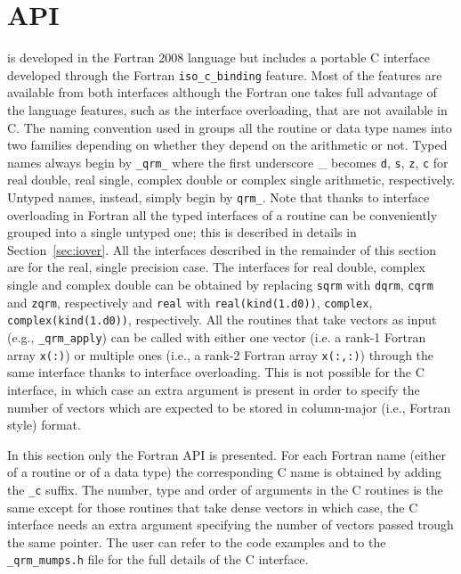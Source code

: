 \documentclass[11pt]{article}
\begin{document}

\newpage
\section{API}
\qrm is developed in the Fortran 2008 language but includes a portable
C interface developed through the Fortran \texttt{iso\_c\_binding}
feature. Most of the \qrm features are available from both interfaces
although the Fortran one takes full advantage of the language
features, such as the interface overloading, that are not available in
C. The naming convention used in \qrm groups all the routine or data
type names into two families depending on whether they depend on the
arithmetic or not. Typed names always begin by \texttt{\_qrm\_} where
the first underscore \_ becomes \texttt{d}, \texttt{s}, \texttt{z},
\texttt{c} for real double, real single, complex double or complex
single arithmetic, respectively. Untyped names, instead, simply begin
by \texttt{qrm\_}. Note that thanks to interface overloading in
Fortran all the typed interfaces of a routine can be conveniently
grouped into a single untyped one; this is described in details in
Section~\ref{sec:iover}. All the interfaces described in the
remainder of this section are for the real, single precision case. The
interfaces for real double, complex single and complex double can be
obtained by replacing \texttt{sqrm} with \texttt{dqrm}, \texttt{cqrm}
and \texttt{zqrm}, respectively and \texttt{real} with
\texttt{real(kind(1.d0))}, \texttt{complex},
\texttt{complex(kind(1.d0))}, respectively. All the routines that take
vectors as input (e.g., \texttt{\_qrm\_apply}) can be called with
either one vector (i.e. a rank-1 Fortran array \texttt{x(:)}) or
multiple ones (i.e., a rank-2 Fortran array \texttt{x(:,:)}) through
the same interface thanks to interface overloading. This is not
possible for the C interface, in which case an extra argument is
present in order to specify the number of vectors which are expected
to be stored in column-major (i.e., Fortran style) format.

In this section only the Fortran API is presented. For each Fortran
name (either of a routine or of a data type) the corresponding C name
is obtained by adding the \texttt{\_c} suffix. The number, type and
order of arguments in the C routines is the same except for those
routines that take dense vectors in which case, the C interface needs
an extra argument specifying the number of vectors passed trough the
same pointer. The user can refer to the code examples and to the
\texttt{\_qrm\_mumps.h} file for the full details of the C interface.
\end{document}
